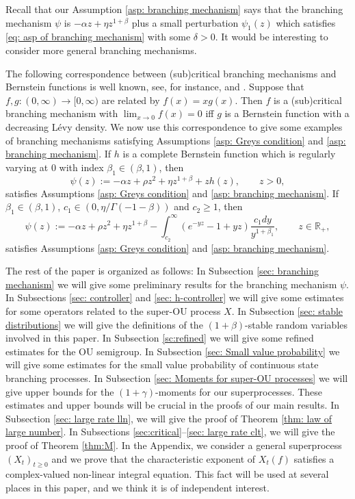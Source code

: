 \documentclass[EJP]{ejpecp} %
\begin{document}
	Recall that our Assumption \ref{asp: branching mechanism} says that the branching mechanism $\psi$ is $-\alpha z +\eta z^{1+\beta}$ plus a small perturbation $\psi_1(z)$ which satisfies \eqref{eq: asp of branching mechanism} with some $\delta>0$.
	It would be interesting to consider more general branching mechanisms.

	The following correspondence between (sub)critical branching mechanisms and Bernstein functions is well known, see, for instance, \cite[Theorem VII.4(ii)]{Bertoin} and \cite[Proposition 7]{BRY}. 
	Suppose that $f, g:(0, \infty)\to [0, \infty)$ are related by $f(x)=xg(x)$.
	Then $f$ is a (sub)critical branching mechanism with $\lim_{x\to 0}f(x)=0$ iff $g$ is a Bernstein function with a decreasing L\'evy density.
	We now use this correspondence to give some examples of branching mechanisms satisfying Assumptions \ref{asp: Greys condition} and \ref{asp: branching mechanism}.
	If $h$ is a complete Bernstein function which is regularly varying at 0 with index $\beta_1\in (\beta, 1)$, then
\[
  	\psi(z)
  	:= -\alpha z + \rho z^2+\eta z^{1+\beta}+zh(z), 
  	\qquad z>0,
\]
	satisfies Assumptions \ref{asp: Greys condition} and \ref{asp: branching mechanism}.
	If $\beta_1\in (\beta, 1)$, $c_1\in (0, \eta/\Gamma(-1-\beta))$ and $c_2\ge 1$, then
\[
  	\psi(z)
  	:=-\alpha z + \rho z^2+\eta z^{1+\beta}-\int^\infty_{c_2} (e^{-yz}-1+yz)\frac{c_1dy}{y^{1+\beta_1}}, 
  	\qquad z\in \mathbb R_+,
\]
	satisfies Assumptions \ref{asp: Greys condition} and \ref{asp: branching mechanism}.

	The rest of the paper is organized as follows:
	In Subsection \ref{sec: branching mechanism} we will give some preliminary results for the branching mechanism $\psi$.
	In Subsections \ref{sec: controller} and \ref{sec: h-controller} we will give some estimates for some operators related to the super-OU process $X$.
	In Subsection \ref{sec: stable distributions} we will give the definitions of the $(1+\beta)$-stable random variables involved in this paper.
	In Subsection \ref{sc:refined} we will give 
	some refined estimates for the OU semigroup.
	In Subsection \ref{sec: Small value probability} we will give some estimates for the small value probability of continuous state branching processes.
	In Subsection \ref{sec: Moments for super-OU processes} we will give upper bounds for the $(1+\gamma)$-moments for our superprocesses.
	These estimates and upper bounds will be crucial in the proofs of our main results.
	In Subsection \ref{sec: large rate lln}, we will give the proof of Theorem \ref{thm: law of large number}.
	In Subsections \ref{sec:critical}--\ref{sec: large rate clt}, we will give the proof of Theorem \ref{thm:M}.
	In the Appendix, we consider a general superprocess $(X_t)_{t\geq 0}$ and we prove that the characteristic exponent of $X_t(f)$ satisfies a complex-valued non-linear integral equation.
	This fact will be used at several places in this paper, and we think it is of independent interest.
\end{document}
